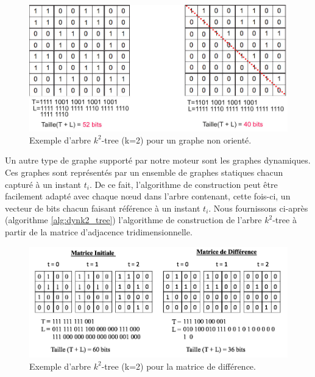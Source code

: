 \documentclass[a4paper,oneside,12pt]{report}
\theoremstyle{definition}
\begin{document}
\begin{figure}[H]
	\includegraphics[scale=0.48]{./ressources/image/k2_non.jpg}
	\caption[Exemple d'arbre $k^2$-tree (k=2) pour un graphe non orienté.]{Exemple d'arbre $k^2$-tree (k=2) pour un graphe non orienté.}
	\label{k2_non}
\end{figure}

	Un autre type de graphe supporté par notre moteur sont les graphes dynamiques. Ces graphes sont représentés par un ensemble de graphes statiques chacun capturé à un instant $t_i$. De ce fait, l'algorithme de construction peut être facilement adapté avec chaque nœud dans l'arbre contenant, cette fois-ci, un vecteur de bits chacun faisant référence à un instant $t_i$. Nous fournissons ci-après (algorithme \ref{alg:dynk2_tree}) l'algorithme de construction de l'arbre $k^2$-tree à partir de la matrice d'adjacence tridimensionnelle.
	

\begin{figure}[H]
	\includegraphics[scale=0.48]{./ressources/image/dynk2diff.png}
	\caption[Exemple d'arbre $k^2$-tree (k=2) pour la matrice de différence]{Exemple d'arbre $k^2$-tree (k=2) pour la matrice de différence.}
	\label{k2_non}
\end{figure}
\end{document}
